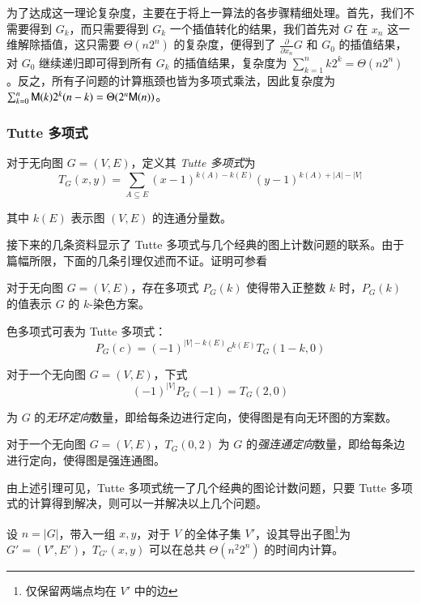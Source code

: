 为了达成这一理论复杂度，主要在于将上一算法的各步骤精细处理。首先，我们不需要得到 $G_k$，而只需要得到 $G_k$ 一个插值转化的结果，我们首先对 $G$ 在 $x_n$ 这一维解除插值，这只需要 $\Theta(n2^n)$ 的复杂度，便得到了 $\frac{\partial}{\partial x_n} G$ 和 $G_0$ 的插值结果，对 $G_0$ 继续递归即可得到所有 $G_k$ 的插值结果，复杂度为 $\sum_{k=1}^n k2^k = \Theta(n2^n)$。反之，所有子问题的计算瓶颈也皆为多项式乘法，因此复杂度为 $\sum_{k=0}^n \mathsf M(k) 2^k(n-k) = \Theta(2^n\mathsf M(n))$。

\subsubsection{Tutte 多项式}

\begin{definition}
对于无向图 $G = (V, E)$，定义其 \emph{Tutte 多项式}为
$$T_G(x,y)=\sum_{A\subseteq E}(x-1)^{k(A)-k(E)}(y-1)^{k(A)+|A|-|V|}$$

其中 $k(E)$ 表示图 $(V, E)$ 的连通分量数。
\end{definition}

接下来的几条资料显示了 Tutte 多项式与几个经典的图上计数问题的联系。由于篇幅所限，下面的几条引理仅述而不证。证明可参看 \cite[X.4]{graph}

\begin{definition}[色多项式]
对于无向图 $G = (V, E)$，存在多项式 $P_G(k)$ 使得带入正整数 $k$ 时，$P_G(k)$ 的值表示 $G$ 的 $k$-染色方案。
\end{definition}

\begin{lemma}
色多项式可表为 Tutte 多项式：
$$P_G(c)=(-1)^{|V|-k(E)}c^{k(E)}T_G(1-k, 0)$$
\end{lemma}

\begin{lemma}
对于一个无向图 $G = (V, E)$，下式
$$(-1)^{|V|}P_G(-1)=T_G(2,0)$$

为 $G$ 的\emph{无环定向}数量，即给每条边进行定向，使得图是有向无环图的方案数。
\end{lemma}

\begin{lemma}
对于一个无向图 $G = (V, E)$，$T_G(0,2)$ 为 $G$ 的\emph{强连通定向}数量，即给每条边进行定向，使得图是强连通图。
\end{lemma}

由上述引理可见，Tutte 多项式统一了几个经典的图论计数问题，只要 Tutte 多项式的计算得到解决，则可以一并解决以上几个问题。

\begin{theorem}
设 $n=|G|$，带入一组 $x,y$，对于 $V$ 的全体子集 $V'$，设其导出子图\footnote{仅保留两端点均在 $V'$ 中的边}为 $G'=(V',E')$，$T_{G'}(x,y)$ 可以在总共 $\Theta(n^2 2^n)$ 的时间内计算。
\end{theorem}

